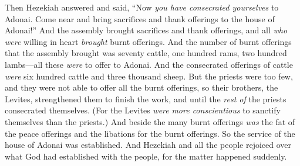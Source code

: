 \begin{biblechapter}
\verse Then Hezekiah answered and said, “Now \textit{you have consecrated yourselves} to Adonai. Come near and bring sacrifices and thank offerings to the house of Adonai!” And the assembly brought sacrifices and thank offerings, and all \textit{who were} willing in heart \textit{brought} burnt offerings.
\verse And the number of burnt offerings that the assembly brought was seventy cattle, one hundred rams, two hundred lambs—all these \textit{were} to offer to Adonai.
\verse And the consecrated offerings of cattle \textit{were} six hundred cattle and three thousand sheep.
\verse But the priests were too few, and they were not able to offer all the burnt offerings, so their brothers, the Levites, strengthened them to finish the work, and until the \textit{rest of} the priests consecrated themselves. (For the Levites \textit{were} \textit{more conscientious} to sanctify themselves than the priests.)
\verse And beside the many burnt offerings \textit{was} the fat of the peace offerings and the libations for the burnt offerings. So the service of the house of Adonai was established.
\verse And Hezekiah and all the people rejoiced over what God had established with the people, for the matter happened suddenly.
\end{biblechapter}

